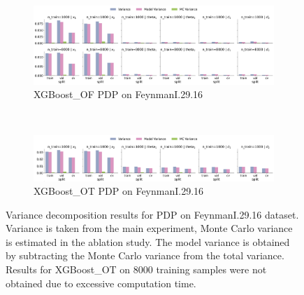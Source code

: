 \documentclass[runningheads]{llncs}
\begin{document}
\begin{figure}[htbp]
    \centering
    \begin{subfigure}[b]{0.9\textwidth}
        \includegraphics[width=\textwidth]{img/FeynmanI.29.16-all/variance_decomposition_pdp_XGBoost_OF.png}
        \caption{XGBoost\_OF PDP on FeynmanI.29.16}
    \end{subfigure}
    \\[10pt]
    \vfill
    \begin{subfigure}[b]{0.9\textwidth}
        \includegraphics[width=\textwidth]{img/FeynmanI.29.16-all/variance_decomposition_pdp_XGBoost_OT.png}
        \caption{XGBoost\_OT PDP on FeynmanI.29.16}
    \end{subfigure}
    \caption{Variance decomposition results for PDP on FeynmanI.29.16 dataset. Variance is taken from the
        main experiment, Monte Carlo variance is estimated in the ablation study. The model variance is
        obtained by subtracting the Monte Carlo variance from the total variance. Results for XGBoost\_OT
        on 8000 training samples were not obtained due to excessive computation time.}
    \label{fig:pdp-variance-decomp-feynman}  %
\end{figure}
\end{document}
